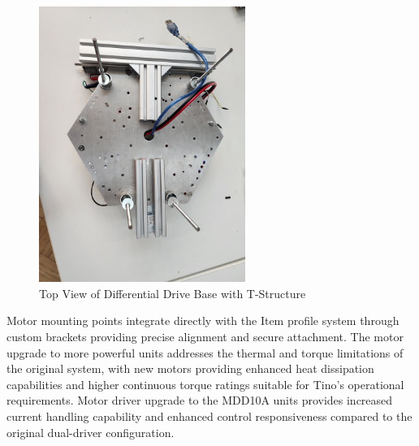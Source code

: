 \begin{figure}[H]
    \centering
    \includegraphics[width=0.6\textwidth]{Images/NewBaseDifferentialDrive (5).jpg}
    \caption{Top View of Differential Drive Base with T-Structure}
    \label{fig:differential_base_top}
\end{figure}

Motor mounting points integrate directly with the Item profile system through custom brackets providing precise alignment and secure attachment. The motor upgrade to more powerful units addresses the thermal and torque limitations of the original system, with new motors providing enhanced heat dissipation capabilities and higher continuous torque ratings suitable for Tino's operational requirements. Motor driver upgrade to the MDD10A units provides increased current handling capability and enhanced control responsiveness compared to the original dual-driver configuration.

